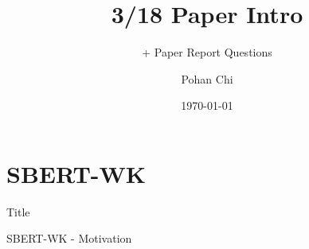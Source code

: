 \documentclass[10pt]{beamer}
\title{3/18 Paper Intro}
\subtitle{ + Paper Report Questions}
\author{Pohan Chi}
\date{\today}
\begin{document}
\maketitle

\maketoc


\section{SBERT-WK}

\begin{frame}{Title}
    \begin{figure}
        \begin{center}
        \end{center}
    \end{figure}
\end{frame}

\begin{frame}{SBERT-WK - Motivation}
    \begin{figure}
        \begin{center}
        \end{center}
    \end{figure}
    
\end{frame}
\end{document}
